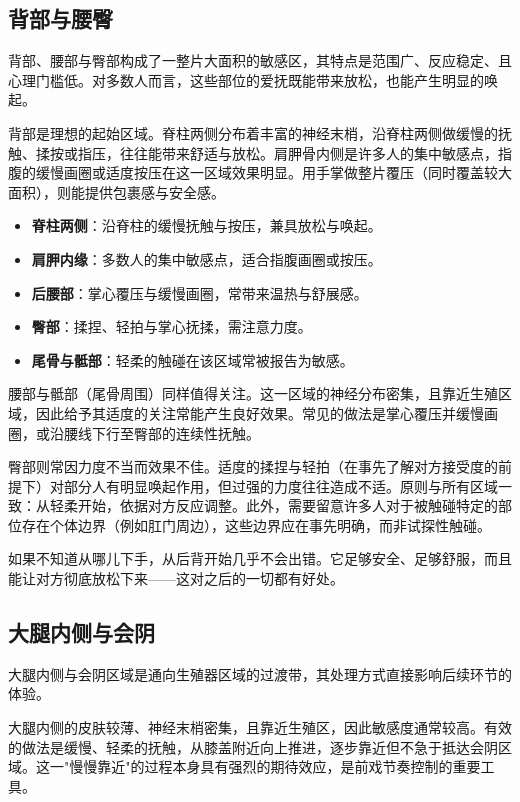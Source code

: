 \documentclass[12pt,UTF8]{ctexbook}
\newcommand{\keyword}[1]{\textbf{#1}}
\begin{document}
\subsection{背部与腰臀}

背部、腰部与臀部构成了一整片大面积的敏感区，其特点是范围广、反应稳定、且心理门槛低。对多数人而言，这些部位的爱抚既能带来放松，也能产生明显的唤起。

背部是理想的起始区域。脊柱两侧分布着丰富的神经末梢，沿脊柱两侧做缓慢的抚触、揉按或指压，往往能带来舒适与放松。肩胛骨内侧是许多人的集中敏感点，指腹的缓慢画圈或适度按压在这一区域效果明显。用手掌做整片覆压（同时覆盖较大面积），则能提供包裹感与安全感。

\begin{itemize}
  \item \keyword{脊柱两侧}：沿脊柱的缓慢抚触与按压，兼具放松与唤起。
  \item \keyword{肩胛内缘}：多数人的集中敏感点，适合指腹画圈或按压。
  \item \keyword{后腰部}：掌心覆压与缓慢画圈，常带来温热与舒展感。
  \item \keyword{臀部}：揉捏、轻拍与掌心抚揉，需注意力度。
  \item \keyword{尾骨与骶部}：轻柔的触碰在该区域常被报告为敏感。
\end{itemize}

腰部与骶部（尾骨周围）同样值得关注。这一区域的神经分布密集，且靠近生殖区域，因此给予其适度的关注常能产生良好效果。常见的做法是掌心覆压并缓慢画圈，或沿腰线下行至臀部的连续性抚触。

臀部则常因力度不当而效果不佳。适度的揉捏与轻拍（在事先了解对方接受度的前提下）对部分人有明显唤起作用，但过强的力度往往造成不适。原则与所有区域一致：从轻柔开始，依据对方反应调整。此外，需要留意许多人对于被触碰特定的部位存在个体边界（例如肛门周边），这些边界应在事先明确，而非试探性触碰。

\begin{tcolorbox}[colback=pink!5!white,colframe=red!50!black,title=贴心小叮咛]
如果不知道从哪儿下手，从后背开始几乎不会出错。它足够安全、足够舒服，而且能让对方彻底放松下来——这对之后的一切都有好处。
\end{tcolorbox}
\subsection{大腿内侧与会阴}

大腿内侧与会阴区域是通向生殖器区域的过渡带，其处理方式直接影响后续环节的体验。

大腿内侧的皮肤较薄、神经末梢密集，且靠近生殖区，因此敏感度通常较高。有效的做法是缓慢、轻柔的抚触，从膝盖附近向上推进，逐步靠近但不急于抵达会阴区域。这一"慢慢靠近"的过程本身具有强烈的期待效应，是前戏节奏控制的重要工具。
\end{document}
